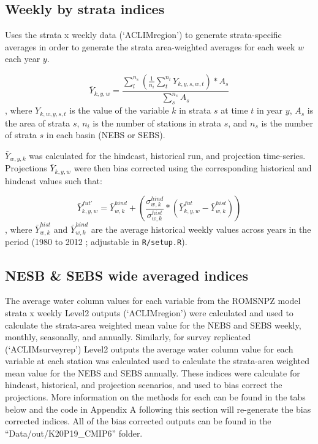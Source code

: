 \documentclass[
]{article}
\begin{document}
\hypertarget{weekly-by-strata-indices}{%
\subsection{Weekly by strata indices}\label{weekly-by-strata-indices}}

Uses the strata x weekly data (`ACLIMregion') to generate
strata-specific averages in order to generate the strata area-weighted
averages for each week \(w\) each year \(y\).

\[\bar{Y}_{k,y,w}= \frac{\sum^{n_s}_{l}(\frac{1}{n_i}\sum^{n_t}_{t}Y_{k,y,s,w,t})*A_s} {\sum^{n_s}_{s}{A_s}}\],
where \(Y_{k,w,y,s,t}\) is the value of the variable \(k\) in strata
\(s\) at time \(t\) in year \(y\), \(A_s\) is the area of strata \(s\),
\(n_i\) is the number of stations in strata \(s\), and \(n_s\) is the
number of strata \(s\) in each basin (NEBS or SEBS).

\(\bar{Y}_{w,y,k}\) was calculated for the hindcast, historical run, and
projection time-series. Projections \(\bar{Y}_{k,y,w}\) were then bias
corrected using the corresponding historical and hindcast values such
that:

\[\bar{Y}^{fut'}_{k,y,w} =\bar{Y}^{hind}_{w,k} +\left( \frac{\sigma^{hind}_{w,k}}{\sigma^{hist}_{w,k}}*(\bar{Y}^{fut}_{k,y,w}-\bar{Y}^{hist}_{w,k})  \right )\],
where \(\bar{Y}^{hist}_{w,k}\) and \(\bar{Y}^{hind}_{w,k}\) are the
average historical weekly values across years in the period (1980 to
2012 ; adjustable in \texttt{R/setup.R}).

\hypertarget{nesb-sebs-wide-averaged-indices}{%
\subsection{NESB \& SEBS wide averaged
indices}\label{nesb-sebs-wide-averaged-indices}}

The average water column values for each variable from the ROMSNPZ model
strata x weekly Level2 outputs (`ACLIMregion') were calculated and used
to calculate the strata-area weighted mean value for the NEBS and SEBS
weekly, monthly, seasonally, and annually. Similarly, for survey
replicated (`ACLIMsurveyrep') Level2 outputs the average water column
value for each variable at each station was calculated used to calculate
the strata-area weighted mean value for the NEBS and SEBS annually.
These indices were calculate for hindcast, historical, and projection
scenarios, and used to bias correct the projections. More information on
the methods for each can be found in the tabs below and the code in
Appendix A following this section will re-generate the bias corrected
indices. All of the bias corrected outputs can be found in the
``Data/out/K20P19\_CMIP6'' folder.
\end{document}
